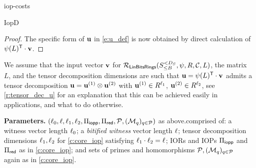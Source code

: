 \begin{lncsappendix}{iop-costs}
\begin{lncsmove}{IopD}
\begin{proof}
The specific form of $\mathbf{u}$ in \eqref{e:u_def} is now obtained by direct calculation of $\psi(L)^{\mathsf{T}} \cdot \mathbf{v}$. 
%

\end{proof}

We assume that the input vector $\mathbf{v}$ for $\mathcal{R}_{\mathsf{LinBitsRings}}({S_{\leq B}^{<D_S}}, \psi, R,\mathcal{C},L)$, the matrix $L$, and the tensor decomposition dimensions are such that $\mathbf{u}= \psi(L)^\mathsf{T}\cdot \mathbf{v}$ admits a tensor decomposition $\mathbf{u}=\mathbf{u}^{(1)}\otimes \mathbf{u}^{(2)}$ with $\mathbf{u}^{(1)}\in R^{\ell_1}$, $\mathbf{u}^{(2)}\in R^{\ell_2}$, see \cref{r:tensor_dec_u} for an explanation that this can be achieved easily in  applications, and what to do otherwise. 

\begin{construction}\label{c:LinModFieldBin}

 \textbf{Parameters.} $(\ell_0, \ell, \ell_1,\ell_2, \Pi_{\mathsf{iopp}}, \Pi_{\mathsf{red}}, \mathcal{P}, (\mathcal{M}_q)_{q\in \mathcal{P}})$ \iflncs as above.\else comprised of: a witness vector length $\ell_0$; a \emph{bitified witness} vector length $\ell$; tensor decomposition dimensions $\ell_1, \ell_2$ for \cref{c:core_iop} satisfying $\ell_1\cdot \ell_2 = \ell$; IORs and IOPs $\Pi_{\mathsf{iopp}}$ and $\Pi_{\mathsf{red}}$ as in \cref{c:core_iop}; and sets of primes and homomorphisms $ \mathcal{P}, (\mathcal{M}_q)_{q\in \mathcal{P}}$ again as in \cref{c:core_iop}.\\\fi



\end{construction}
\end{lncsmove}
\end{lncsappendix}
